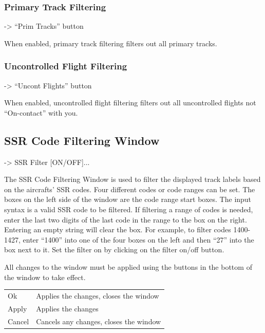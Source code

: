\documentclass[a4paper,oneside,11pt]{memoir}
\begin{document}
\bigskip

\subsubsection{Primary Track Filtering}\label{func:filterpri}

 -> “Prim Tracks” button

When enabled, primary track filtering filters out all primary tracks.

\subsubsection{Uncontrolled Flight Filtering}\label{func:filterunc}

 -> “Uncont Flights” button

When enabled, uncontrolled flight filtering filters out all uncontrolled flights not “On-contact” with you.

\subsection{SSR Code Filtering Window}
\label{win:ssr}

 -> SSR Filter [ON/OFF]...

\bigskip


The SSR Code Filtering Window is used to filter the displayed track labels based on the aircrafts’ SSR codes. Four different codes or code ranges can be set. The boxes on the left side of the window are the code range start boxes. The input syntax is a valid SSR code to be filtered. If filtering a range of codes is needed, enter the last two digits of the last code in the range to the box on the right. Entering an empty string will clear the box. For example, to filter codes 1400-1427, enter “1400” into one of the four boxes on the left and then “27” into the box next to it. Set the filter on by clicking on the filter on/off button.

\bigskip

All changes to the window must be applied using the buttons in the bottom of the window to take effect.

\bigskip

\begin{longtable}{p{2.5cm} p{10cm}}
    Ok      & Applies the changes, closes the window\\
    Apply   & Applies the changes\\
    Cancel  & Cancels any changes, closes the window\\
\end{longtable}
\end{document}
